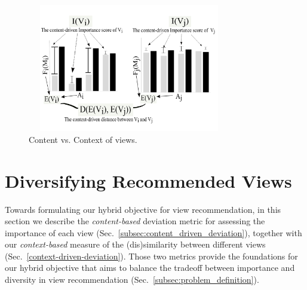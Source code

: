 
\begin{figure}
	\includegraphics[width=3.5in,height=2.2in]{figures/introduction/pre2}
\vspace{-18pt}
	\caption[content vs context]{Content vs. Context of views.}
	\label{fig:content-contex}
\vspace{-8pt}
\end{figure}

\section{Diversifying Recommended Views}
\label{sec:diversifying_recommended_visualizations}


Towards formulating our hybrid objective for view recommendation, in this section we describe the {\em content-based} deviation metric for assessing the importance of each view (Sec.~\ref{subsec:content_driven_deviation}), together with our {\em context-based} measure of the (dis)similarity between different views (Sec.~\ref{context-driven-deviation}). 
%
Those two metrics provide the foundations for our hybrid objective that aims to balance the tradeoff between importance and diversity in view recommendation (Sec.~\ref{subsec:problem_definition}).  


